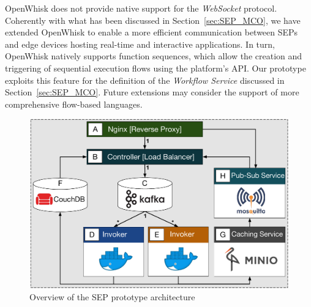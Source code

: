 OpenWhisk does not provide native support for the \textit{WebSocket} protocol. Coherently with what has been discussed in Section~\ref{sec:SEP_MCO}, we have extended OpenWhisk to enable a more efficient communication between SEPs and edge devices hosting real-time and interactive applications. 
In turn, OpenWhisk natively supports function sequences, which allow the creation and triggering of sequential execution flows using the platform's API. Our prototype exploits this feature for the definition of the \textit{Workflow Service} discussed in Section~\ref{sec:SEP_MCO}. Future extensions may consider the support of more comprehensive flow-based languages. %

\begin{figure}[tbp]
	\centering
	\includegraphics[width=1\linewidth]{Figs/Serverless_Edge_Platform_Prototype.pdf}
	\caption{Overview of the SEP prototype architecture}
	\label{fig:Serverless_Edge_Platform_Overview}
\end{figure}

